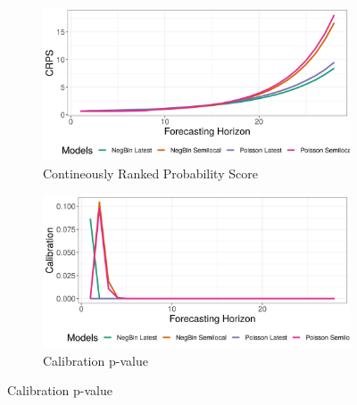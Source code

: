 \begin{figure}[H]
\begin{subfigure}{0.5\textwidth}
  \centering
  \includegraphics[width=\linewidth]{../output/Beni_crps.png}  
  \caption{Contineously Ranked Probability Score}
  \label{Beni_scores_1}
\end{subfigure}
\begin{subfigure}{0.5\textwidth}
  \centering
  \includegraphics[width=\linewidth]{../output/Beni_calibration.png}  
  \caption{Calibration p-value}
  \label{Beni_scores_2}
\end{subfigure}


\end{figure}

